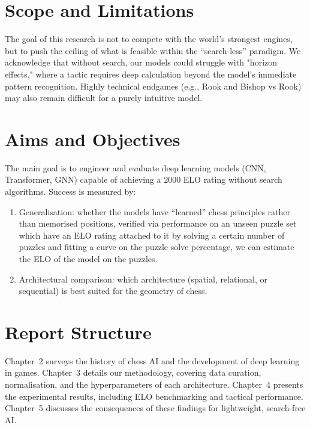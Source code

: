 \section{Scope and Limitations}
The goal of this research is not to compete with the world's strongest engines, but to push the ceiling of what is feasible within the ``search-less'' paradigm.
We acknowledge that without search, our models could struggle with "horizon effects," where a tactic requires deep calculation beyond the model's immediate pattern recognition. Highly technical endgames (e.g., Rook and Bishop vs Rook) may also remain difficult for a purely intuitive model.

\section{Aims and Objectives}
The main goal is to engineer and evaluate deep learning models (CNN, Transformer, GNN) capable of achieving a 2000 ELO rating without search algorithms. Success is measured by:

\begin{enumerate}
    \item Generalisation: whether the models have ``learned'' chess principles rather than memorised positions, verified via performance on an unseen puzzle set which have an ELO rating attached to it by solving a certain number of puzzles and fitting a curve on the puzzle solve percentage, we can estimate the ELO of the model on the puzzles.
    \item Architectural comparison: which architecture (spatial, relational, or sequential) is best suited for the geometry of chess.
\end{enumerate}

\section{Report Structure}
Chapter~2 surveys the history of chess AI and the development of deep learning in games. Chapter~3 details our methodology, covering data curation, normalisation, and the hyperparameters of each architecture. Chapter~4 presents the experimental results, including ELO benchmarking and tactical performance. Chapter~5 discusses the consequences of these findings for lightweight, search-free AI.
